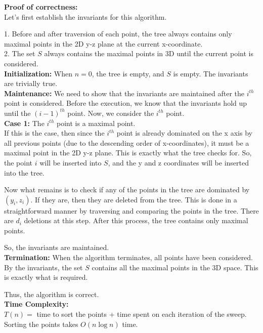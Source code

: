 \documentclass[a4paper]{article}
\begin{document}
\begin{enumerate}
    \textbf{Proof of correctness:}\\
    Let's first establish the invariants for this algorithm.

    1. Before and after traversion of each point, the tree always contains only maximal points in the 2D y-z plane at the current x-coordinate.\\
    2. The set $S$ always contains the maximal points in 3D until the current point is considered.\\

    \textbf{Initialization:} When $n=0$, the tree is empty, and $S$ is empty. The invariants are trivially true.\\

    \textbf{Maintenance:} We need to show that the invariants are maintained after the $i^{th}$ point is considered. Before the execution, we know that the invariants hold up until the $(i-1)^{th}$ point. Now, we consider the $i^{th}$ point.\\

    \textbf{Case 1:} The $i^{th}$ point is a maximal point.\\
    If this is the case, then since the $i^{th}$ point is already dominated on the x axis by all previous points (due to the descending order of x-coordinates), it must be a maximal point in the 2D y-z plane. This is exactly what the tree checks for. So, the point $i$ will be inserted into $S$, and the y and z coordinates will be inserted into the tree. 

    Now what remains is to check if any of the points in the tree are dominated by $(y_i, z_i)$. If they are, then they are deleted from the tree. This is done in a straightforward manner by traversing and comparing the points in the tree. There are $d_i$ deletions at this step. After this process, the tree contains only maximal points.

    So, the invariants are maintained.\\

    \textbf{Termination:} When the algorithm terminates, all points have been considered. By the invariants, the set $S$ contains all the maximal points in the 3D space. This is exactly what is required.

    Thus, the algorithm is correct.\\

    \textbf{Time Complexity:}\\
    $T(n) = $ time to sort the points + time spent on each iteration of the sweep.\\
    Sorting the points takes $O(n \log n)$ time.\\


\end{enumerate}
\end{document}

